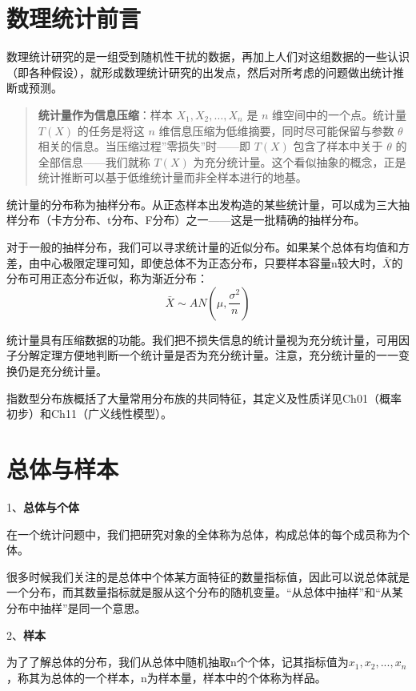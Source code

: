 \documentclass[
]{book}
\begin{document}
\section{数理统计前言}\label{ux6570ux7406ux7edfux8ba1ux524dux8a00}

数理统计研究的是一组受到随机性干扰的数据，再加上人们对这组数据的一些认识（即各种假设），就形成数理统计研究的出发点，然后对所考虑的问题做出统计推断或预测。

\begin{quote}
\textbf{统计量作为信息压缩}：样本 \(X_1, X_2, \ldots, X_n\) 是 \(n\) 维空间中的一个点。统计量 \(T(X)\) 的任务是将这 \(n\) 维信息压缩为低维摘要，同时尽可能保留与参数 \(\theta\) 相关的信息。当压缩过程''零损失''时------即 \(T(X)\) 包含了样本中关于 \(\theta\) 的全部信息------我们就称 \(T(X)\) 为充分统计量。这个看似抽象的概念，正是统计推断可以基于低维统计量而非全样本进行的地基。
\end{quote}

统计量的分布称为抽样分布。从正态样本出发构造的某些统计量，可以成为三大抽样分布（卡方分布、t分布、F分布）之一------这是一批精确的抽样分布。

对于一般的抽样分布，我们可以寻求统计量的近似分布。如果某个总体有均值和方差，由中心极限定理可知，即使总体不为正态分布，只要样本容量n较大时，\(\bar{X}\)的分布可用正态分布近似，称为渐近分布：
\[
\bar{X}\sim AN(\mu,\frac{\sigma^2}{n})
\]

统计量具有压缩数据的功能。我们把不损失信息的统计量视为充分统计量，可用因子分解定理方便地判断一个统计量是否为充分统计量。注意，充分统计量的一一变换仍是充分统计量。

指数型分布族概括了大量常用分布族的共同特征，其定义及性质详见Ch01（概率初步）和Ch11（广义线性模型）。

\section{总体与样本}\label{ux603bux4f53ux4e0eux6837ux672c}

1、\textbf{总体与个体}

在一个统计问题中，我们把研究对象的全体称为总体，构成总体的每个成员称为个体。

很多时候我们关注的是总体中个体某方面特征的数量指标值，因此可以说总体就是一个分布，而其数量指标就是服从这个分布的随机变量。``从总体中抽样''和``从某分布中抽样''是同一个意思。

2、\textbf{样本}

为了了解总体的分布，我们从总体中随机抽取n个个体，记其指标值为\(x_1,x_2,...,x_n\)，称其为总体的一个样本，n为样本量，样本中的个体称为样品。
\end{document}
